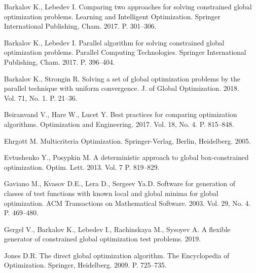 \documentclass{cmi}
\begin{document}
\begin{biblio_lat}

Barkalov K., Lebedev I.
\newblock Comparing two approaches for solving constrained global optimization
  problems.
\newblock Learning and Intelligent Optimization. Springer International
  Publishing, Cham. 2017. P. 301--306.
\newblock {}

Barkalov K., Lebedev I.
\newblock Parallel algorithm for solving constrained global optimization
  problems.
\newblock Parallel Computing Technologies. Springer International
  Publishing, Cham. 2017. P. 396--404.
\newblock {}

Barkalov K., Strongin R.
\newblock Solving a set of global optimization problems by the parallel
  technique with uniform convergence.
\newblock J. of Global Optimization. 2018. Vol. 71, No. 1. P. 21--36.
\newblock {}

Beiranvand V., Hare W., Lucet Y.
\newblock Best practices for comparing optimization algorithms.
\newblock Optimization and Engineering. 2017. Vol. 18, No. 4. P. 815--848.
\newblock {}

Ehrgott M.
\newblock Multicriteria Optimization.
\newblock Springer-Verlag, Berlin, Heidelberg. 2005.
\newblock {}

Evtushenko Y., Posypkin M.
\newblock A deterministic approach to global box-constrained optimization.
\newblock Optim. Lett. 2013. Vol. 7 P. 819--829.
\newblock {}

{Gaviano M., Kvasov D.E., Lera D., Sergeev Ya.D.}
\newblock Software for generation of classes of test functions with known local
  and global minima for global optimization.
\newblock ACM Transactions on Mathematical Software. 2003. Vol. 29, No. 4. P.
  469--480.
\newblock {}

Gergel V., Barkalov K., Lebedev I., Rachinskaya M., Sysoyev A.
\newblock A flexible generator of constrained global optimization test
  problems. 2019.
\newblock {}

{Jones D.R.}
\newblock The direct global optimization algorithm.
\newblock The Encyclopedia of Optimization. Springer, Heidelberg. 2009. P.
  725--735.
\newblock {}


\end{biblio_lat}
\end{document}
